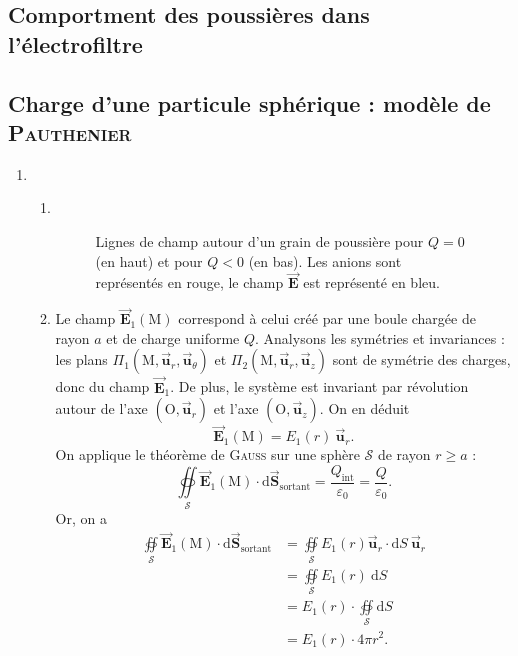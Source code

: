\documentclass[a4paper, 10pt]{article}
\makeatletter
\let\@vec\vec
\renewcommand{\vec}[1]{\ensuremath{\@vec{\mathbf{#1}}}}
\makeatother
\begin{document}
\begin{multicols}{2}
		\section{Comportment des poussières dans l'électrofiltre}
		\subsection{Charge d'une particule sphérique : modèle de \textsc{Pauthenier}}
		\begin{enumerate}
			\item
				\begin{enumerate}
					\item~
						\begin{figure}[H]
							\centering
							\def\svgwidth{0.5\textwidth}
							\caption{Lignes de champ autour d’un grain de poussière pour $Q = 0$ (en haut) et pour $Q < 0$ (en bas). Les anions sont représentés en rouge, le champ $\vec{E}$\/ est représenté en bleu.}
							\label{fig:particule}
						\end{figure}
					\item Le champ $\vec{E}_1(\mathrm{M})$\/ correspond à celui créé par une boule chargée de rayon $a$\/ et de charge uniforme $Q$.
						Analysons les symétries et invariances : les plans $\Pi_1(\mathrm{M}, \vec{u}_r, \vec{u}_\theta)$\/ et $\Pi_2(\mathrm{M}, \vec{u}_r, \vec{u}_z)$\/ sont de symétrie des charges, donc du champ $\vec{E}_1$. De plus, le système est invariant par révolution autour de l'axe $(\mathrm{O}, \vec{u}_r)$\/ et l'axe $(\mathrm{O}, \vec{u}_z)$. On en déduit \[
							\vec{E}_1(\mathrm{M}) = E_1(r)\:\vec{u}_r
						.\]
						On applique le théorème de \textsc{Gauss} sur une sphère $\mathcal{S}$ de rayon $r \ge a$ : \[
							\oiint\limits_\mathcal{S} \vec{E}_1(\mathrm{M}) \cdot \mathrm{d}\vec{S}_\mathrm{sortant} = \frac{Q_\mathrm{int}}{\varepsilon_0} = \frac{Q}{\varepsilon_0}
						.\]
						Or, on a
						\begin{align*}
							\oiint\limits_\mathcal{S} \vec{E}_1(\mathrm{M})\cdot \mathrm{d}\vec{S}_\mathrm{sortant}
							&= \oiint\limits_\mathcal{S} E_1(r)\vec{u}_r \cdot \mathrm{d}S\:\vec{u}_r \\
							&= \oiint\limits_\mathcal{S} E_1(r)~\mathrm{d}S \\
							&= E_1(r) \cdot \oiint\limits_\mathcal{S} \mathrm{d}S \\
							&= E_1(r) \cdot 4\pi r^2. \\
						\end{align*}

\end{enumerate}
\end{enumerate}
\end{multicols}
\end{document}
